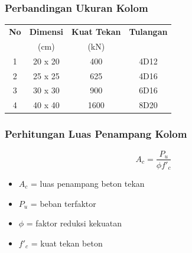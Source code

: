 \documentclass[../main.tex]{subfiles}
\begin{document}
\begin{frame}[t,mycolor=digiPH_leaf,mytitle=standard,dark]
	\frametitle{Perbandingan Ukuran Kolom}

	\begin{table}
		\centering
		\begin{tabular}{c c c c}
			\textbf{No}  &  \textbf{Dimensi}  &  \textbf{Kuat Tekan}  &  \textbf{Tulangan}  \\
			             &  (cm)              &  (kN)                 &  \\
			\hline
			1            &  20 x 20           &  400                  &  4D12  \\
			2            &  25 x 25           &  625                  &  4D16  \\
			3            &  30 x 30           &  900                  &  6D16  \\
			4            &  40 x 40           &  1600                 &  8D20  \\
		\end{tabular}
	\end{table}

\end{frame}



\begin{frame}[t,mycolor=digiPH_leaf,mytitle=standard,dark]
	\frametitle{Perhitungan Luas Penampang Kolom}

	\begin{equation}
		A_c = \frac{P_u}{\phi f'_c}
	\end{equation}

	\begin{itemize}

		\item $A_c$ = luas penampang beton tekan
		\item $P_u$ = beban terfaktor
		\item $\phi$ = faktor reduksi kekuatan
		\item $f'_c$ = kuat tekan beton

	\end{itemize}

\end{frame}
\end{document}
